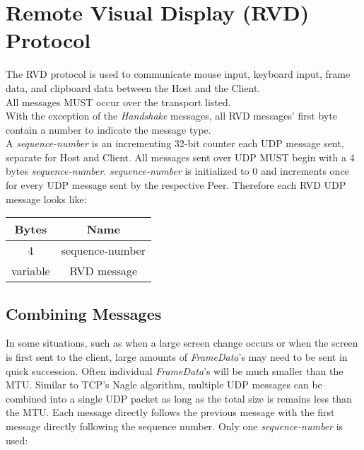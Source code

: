 \section{Remote Visual Display (RVD) Protocol}

The RVD protocol is used to communicate mouse input, keyboard input, frame data, and clipboard data between the
Host and the Client.\\

All messages MUST occur over the transport listed.\\

With the exception of the \emph{Handshake} messages, all RVD messages' first byte contain a number to indicate
the message type. \\

A \emph{sequence-number} is an incrementing 32-bit counter each UDP message sent, separate for Host and Client. All
messages sent over UDP MUST begin with a 4 bytes \emph{sequence-number}. \emph{sequence-number} is initialized
to 0 and increments once for every UDP message sent by the respective Peer. Therefore each RVD UDP message looks
like:

\begin{center}
    \begin{tabular}{|c|c|}
        \hline
        \textbf{Bytes} & \textbf{Name}   \\
        \hline
        4              & sequence-number \\
        \hline
        variable       & RVD message     \\
        \hline
    \end{tabular}
\end{center}

\subsection{Combining Messages}

In some situations, such as when a large screen change occurs or when the screen is first sent to the client,
large amounts of \emph{FrameData}'s may need to be sent in quick succession. Often individual \emph{FrameData}'s
will be much smaller than the MTU. Similar to TCP's Nagle algorithm, multiple UDP messages can be combined into a
single UDP packet as long as the total size is remains less than the MTU. Each message directly follows the
previous message with the first message directly following the sequence number. Only one \emph{sequence-number}
is used:

